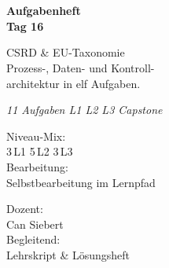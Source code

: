 \documentclass[11pt,a4paper,oneside]{article}
\newcommand{\caveatfontfallback}{\itshape}
\newcommand\caveatfont{\caveatfontfallback}%
\begin{document}
\begin{titlepage}
  \pagestyle{empty}
  \vspace*{1.5cm}
  \\[2pt]
  \noindent{\color{lpAccent}\rule{\linewidth}{1.2pt}}\\[4pt]

  \vspace{3cm}
  {\sffamily\fontsize{30}{34}\selectfont\bfseries\color{lpInk}Aufgabenheft\\Tag 16\par}

  \vspace{0.7cm}
  {\sffamily\large\color{lpGray}CSRD \& EU-Taxonomie \textendash{}\\Prozess-, Daten- und Kontroll-\\architektur in elf Aufgaben.\par}

  \vspace{1.5cm}
  {\caveatfont\LARGE\color{lpAmber}11 Aufgaben \textperiodcentered{} L1 \textperiodcentered{} L2 \textperiodcentered{} L3 \textperiodcentered{} Capstone}\par

  \vfill

  \noindent\begin{minipage}{0.55\linewidth}
    {\sffamily\footnotesize\color{lpGray}Niveau-Mix:}\\
    {\sffamily\small\color{lpInk}3\,\textsf{L1} \textperiodcentered{} 5\,\textsf{L2} \textperiodcentered{} 3\,\textsf{L3}}\\[10pt]
    {\sffamily\footnotesize\color{lpGray}Bearbeitung:}\\
    {\sffamily\small\color{lpInk}Selbstbearbeitung im Lernpfad}
  \end{minipage}\hfill
  \begin{minipage}{0.4\linewidth}
    \raggedleft
    {\sffamily\footnotesize\color{lpGray}Dozent:}\\
    {\sffamily\small\color{lpInk}Can Siebert}\\[10pt]
    {\sffamily\footnotesize\color{lpGray}Begleitend:}\\
    {\sffamily\small\color{lpInk}Lehrskript \& L\"osungsheft}
  \end{minipage}

  \vspace{0.5cm}
  \noindent{\color{lpAccent}\rule{\linewidth}{0.6pt}}
\end{titlepage}
\end{document}
